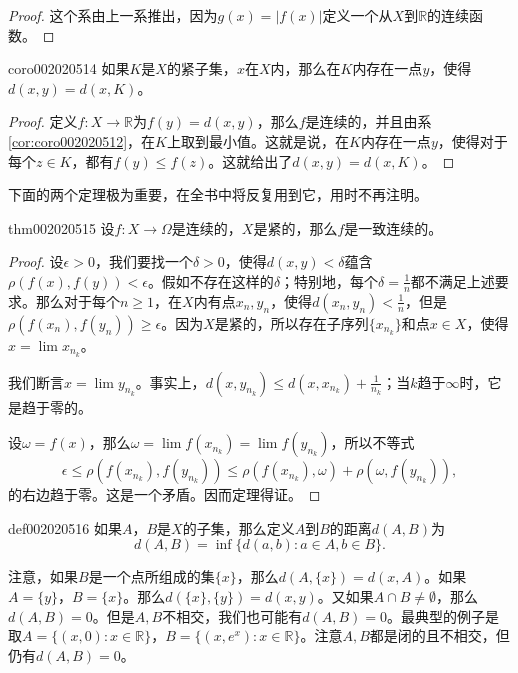 \begin{proof}
这个系由上一系推出，因为$g(x)=|f(x)|$定义一个从$X$到$\mathbb{R}$的连续函数。
\end{proof}

\begin{corollary}{}{coro002020514}
如果$K$是$X$的紧子集，$x$在$X$内，那么在$K$内存在一点$y$，使得$d(x, y) = d(x, K)$。
\end{corollary}

\begin{proof}
定义$f: X \to \mathbb{R}$为$f(y) = d(x, y)$，那么$f$是连续的，并且由系\ref{cor:coro002020512}，在$K$上取到最小值。这就是说，在$K$内存在一点$y$，使得对于每个$z \in K$，都有$f(y) \le f(z)$。这就给出了$d(x, y) = d(x, K)$。
\end{proof}

下面的两个定理极为重要，在全书中将反复用到它，用时不再注明。

\begin{theorem}{}{thm002020515}
设$f:X \to \Omega$是连续的，$X$是紧的，那么$f$是一致连续的。
\end{theorem}

\begin{proof}
设$\epsilon > 0$，我们要找一个$\delta > 0$，使得$d(x, y) < \delta$蕴含$\rho(f(x), f(y)) < \epsilon$。假如不存在这样的$\delta$；特别地，每个$\delta = \frac{1}{n}$都不满足上述要求。那么对于每个$n \ge 1$，在$X$内有点$x_n, y_n$，使得$d(x_n, y_n) < \frac{1}{n}$，但是$\rho(f(x_n), f(y_n)) \ge \epsilon$。因为$X$是紧的，所以存在子序列$\{x_{n_k}\}$和点$x \in X$，使得$x = \lim{x_{n_k}}$。

我们断言$x = \lim{y_{n_k}}$。事实上，$d(x, y_{n_k}) \le d(x, x_{n_k}) + \frac{1}{n_k}$；当$k$趋于$\infty$时，它是趋于零的。

设$\omega = f(x)$，那么$\omega = \lim{f(x_{n_k})} = \lim{f(y_{n_k})}$，所以不等式
\[
\epsilon \le \rho(f(x_{n_k}), f(y_{n_k})) \le \rho(f(x_{n_k}), \omega) + \rho(\omega, f(y_{n_k})),
\]
的右边趋于零。这是一个矛盾。因而定理得证。
\end{proof}

\begin{definition}{}{def002020516}
如果$A$，$B$是$X$的子集，那么定义$A$到$B$的距离$d(A, B)$为
\[
d(A, B) = \inf\{d(a, b): a \in A, b \in B\}.
\]
\end{definition}

注意，如果$B$是一个点所组成的集$\{x\}$，那么$d(A, \{x\}) = d(x, A)$。如果$A = \{y\}$，$B = \{x\}$。那么$d(\{x\}, \{y\}) = d(x, y)$。又如果$A \cap B \neq \emptyset$，那么$d(A, B) = 0$。但是$A, B$不相交，我们也可能有$d(A, B) = 0$。最典型的例子是取$A = \{(x, 0): x \in \mathbb{R}\}$，$B = \{(x, e^x): x \in \mathbb{R}\}$。注意$A, B$都是闭的且不相交，但仍有$d(A, B) = 0$。

